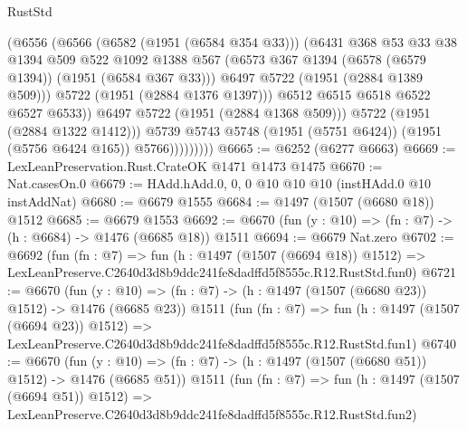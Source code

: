 \begin{lexlean}{RustStd}
\begin{coremodule}
                            (@6556
                              (@6566
                                (@6582 (@1951 (@6584 @354 @33)))
                                (@6431
                                  @368
                                  @53
                                  @33
                                  @38
                                  @1394
                                  @509
                                  @522
                                  @1092
                                  @1388
                                  @567
                                  (@6573 @367 @1394 (@6578 (@6579 @1394)) (@1951 (@6584 @367 @33)))
                                  @6497
                                  @5722
                                  (@1951 (@2884 @1389 @509)))
                                @5722
                                (@1951 (@2884 @1376 @1397)))
                              @6512
                              @6515
                              @6518
                              @6522
                              @6527
                              @6533))
                          @6497
                          @5722
                          (@1951 (@2884 @1368 @509)))
                        @5722
                        (@1951 (@2884 @1322 @1412)))
                      @5739
                      @5743
                      @5748
                      (@1951 (@5751 @6424))
                      (@1951 (@5756 @6424 @165))
                      @5766)))))))))
@6665 := @6252 (@6277 @6663)
@6669 := LexLeanPreservation.Rust.CrateOK @1471 @1473 @1475
@6670 := Nat.casesOn.{0}
@6679 := HAdd.hAdd.{0, 0, 0} @10 @10 @10 (instHAdd.{0} @10 instAddNat)
@6680 := @6679 @1555
@6684 := @1497 (@1507 (@6680 @18)) @1512
@6685 := @6679 @1553
@6692 := @6670 (fun (y : @10) => (fn : @7) -> (h : @6684) -> @1476 (@6685 @18)) @1511
@6694 := @6679 Nat.zero
@6702 := @6692
    (fun (fn : @7) =>
    fun (h : @1497 (@1507 (@6694 @18)) @1512) =>
    LexLeanPreserve.C2640d3d8b9ddc241fe8dadffd5f8555c.R12.RustStd.fun0)
@6721 := @6670
    (fun (y : @10) => (fn : @7) -> (h : @1497 (@1507 (@6680 @23)) @1512) -> @1476 (@6685 @23))
    @1511
    (fun (fn : @7) =>
    fun (h : @1497 (@1507 (@6694 @23)) @1512) =>
    LexLeanPreserve.C2640d3d8b9ddc241fe8dadffd5f8555c.R12.RustStd.fun1)
@6740 := @6670
    (fun (y : @10) => (fn : @7) -> (h : @1497 (@1507 (@6680 @51)) @1512) -> @1476 (@6685 @51))
    @1511
    (fun (fn : @7) =>
    fun (h : @1497 (@1507 (@6694 @51)) @1512) =>
    LexLeanPreserve.C2640d3d8b9ddc241fe8dadffd5f8555c.R12.RustStd.fun2)

\end{coremodule}
\end{lexlean}
